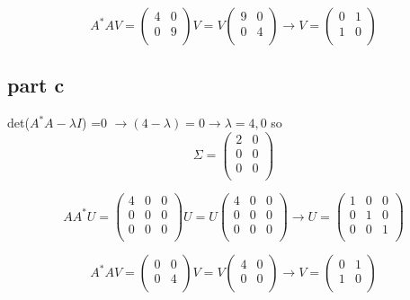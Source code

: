\documentclass[a4paper,12pt]{article}
\begin{document}
\begin{equation}
A^*AV=\begin{pmatrix}
4&0	\\
0&9\\ 
\end{pmatrix}  V = V\begin{pmatrix}
9&0	\\
0&4\\ 
\end{pmatrix} \rightarrow V=\begin{pmatrix}
0&1	\\
1&0\\ 
\end{pmatrix}
\end{equation}


\subsection{part c}
det($A^*A - \lambda I$) =0 $\rightarrow (4-\lambda) =0 \rightarrow \lambda =4,0$
so
\begin{equation}
\Sigma=\begin{pmatrix}
2&0	\\
0&0\\ 
0&0\\ 
\end{pmatrix}
\end{equation}


\begin{equation}
AA^*U=\begin{pmatrix}
4&0&0	\\
0&0&0\\
0&0&0\\ 
\end{pmatrix}  U =U\begin{pmatrix}
4&0&0	\\
0&0&0\\
0&0&0\\ 
\end{pmatrix}  \rightarrow U=\begin{pmatrix}
1&0&0	\\
0&1&0\\
0&0&1\\ 
\end{pmatrix} 
\end{equation}


\begin{equation}
A^*AV=\begin{pmatrix}
0&0	\\
0&4\\ 
\end{pmatrix}  V = V\begin{pmatrix}
4&0	\\
0&0\\ 
\end{pmatrix} \rightarrow  V=\begin{pmatrix}
0&1	\\
1&0\\ 
\end{pmatrix}  
\end{equation}
\end{document}
